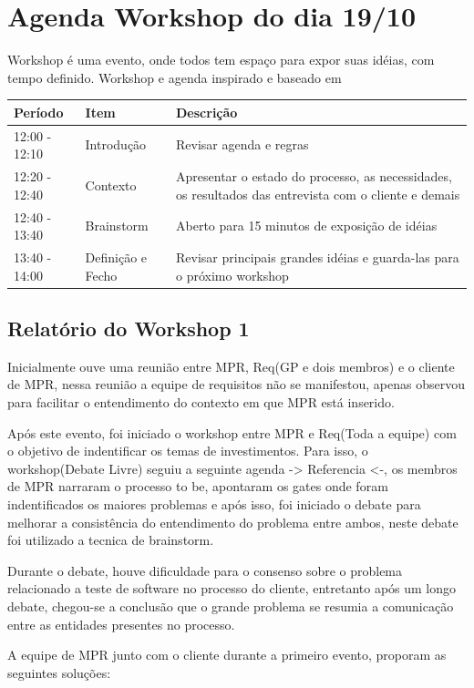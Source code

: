 \section{Agenda Workshop do dia 19/10}

Workshop é uma evento, onde todos tem espaço para expor suas idéias, com tempo definido.
Workshop e agenda inspirado e baseado em \cite{UFPRUNI2}

\begin{table}[H]
	\begin{tabular}{|l|l| p{8cm} |}
		\hline 
		Período & Item & Descrição\tabularnewline
		\hline 
		\hline 
		12:00 - 12:10 & Introdução & Revisar agenda e regras\tabularnewline
		\hline 
		12:20 - 12:40 & Contexto & Apresentar o estado do processo, as necessidades, os resultados das
		entrevista com o cliente e demais\tabularnewline
		\hline 
		12:40 - 13:40 & Brainstorm & Aberto para 15 minutos de exposição de idéias\tabularnewline
		\hline 
		13:40 - 14:00 & Definição e Fecho & Revisar principais grandes idéias e guarda-las para o próximo workshop\tabularnewline
		\hline 
	\end{tabular}
\end{table}

\subsection{Relatório do Workshop 1}

Inicialmente ouve uma reunião entre MPR, Req(GP e dois membros) e o cliente de MPR, nessa reunião a equipe de requisitos não se manifestou, apenas observou para facilitar o entendimento do contexto em que MPR está inserido.

Após este evento, foi iniciado o workshop entre MPR e Req(Toda a equipe) com o objetivo de indentificar os temas de investimentos. Para isso, o workshop(Debate Livre) seguiu a seguinte agenda -> Referencia <-, os membros de MPR narraram o processo to be, apontaram os gates onde foram indentificados os maiores problemas e após isso, foi iniciado o debate para melhorar a consistência do entendimento do problema entre ambos, neste debate foi utilizado a tecnica de brainstorm. 

Durante o debate, houve dificuldade para o consenso sobre o problema relacionado a teste de software no processo do cliente, entretanto após um longo debate, chegou-se a conclusão que o grande problema se resumia a comunicação entre as entidades presentes no processo.

A equipe de MPR junto com o cliente durante a primeiro evento, proporam as seguintes soluções:

